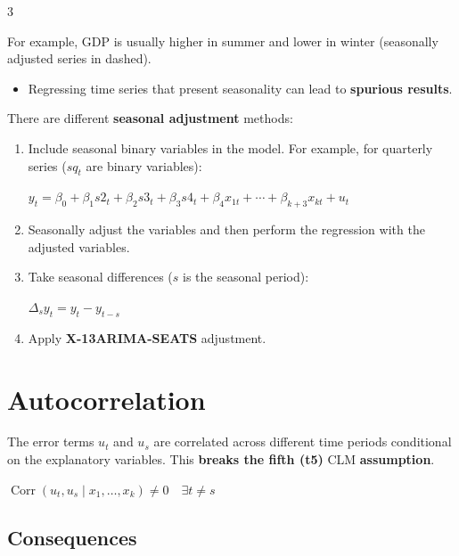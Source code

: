 \documentclass[10pt, a4paper, landscape]{article}
\DeclareMathOperator{\Corr}{Corr}
\begin{document}
\begin{multicols}{3}
\vspace*{0.1cm}

For example, GDP is usually higher in summer and lower in winter (seasonally adjusted series in {\color{red} dashed}).

\begin{itemize}[leftmargin=*]
	\item Regressing time series that present seasonality can lead to \textbf{spurious results}.
\end{itemize}

There are different \textbf{seasonal adjustment} methods:

\begin{enumerate}[leftmargin=*, label=\alph{*}.]
	\item Include seasonal binary variables in the model. For example, for quarterly series (\( sq_{t} \) are binary variables):
	\begin{center}
		\( y_{t} = \beta_{0} + \beta_{1} s2_{t} + \beta_{2} s3_{t} + \beta_{3} s4_{t} + \beta_{4} x_{1t} + \cdots + \beta_{k + 3} x_{kt} + u_{t} \)
	\end{center}
	\item Seasonally adjust the variables and then perform the regression with the adjusted variables.
	\item Take seasonal differences (\( s \) is the seasonal period):
	\begin{center}
		\( \Delta_{s} y_{t} = y_{t} - y_{t - s} \)
	\end{center}
	\item Apply \textbf{X-13ARIMA-SEATS} adjustment.
\end{enumerate}

\columnbreak

\section*{Autocorrelation}

The error terms \( u_{t} \) and \( u_{s} \) are correlated across different time periods conditional on the explanatory variables. This \textbf{breaks the fifth (t5)} CLM \textbf{assumption}.

\begin{center}
	\( \Corr(u_{t}, u_{s} \mid x_{1}, \ldots, x_{k}) \neq 0 \quad \exists t \neq s \)
\end{center}

\subsection*{Consequences}


\end{multicols}
\end{document}
